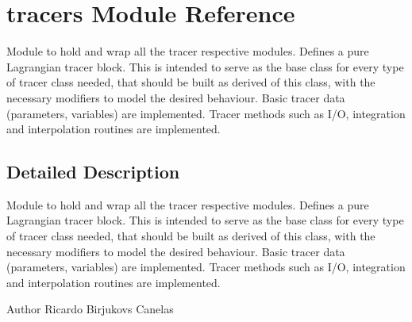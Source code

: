 \hypertarget{namespacetracers}{}\section{tracers Module Reference}
\label{namespacetracers}


Module to hold and wrap all the tracer respective modules. Defines a pure Lagrangian tracer block. This is intended to serve as the base class for every type of tracer class needed, that should be built as derived of this class, with the necessary modifiers to model the desired behaviour. Basic tracer data (parameters, variables) are implemented. Tracer methods such as I/O, integration and interpolation routines are implemented.  




\subsection{Detailed Description}
Module to hold and wrap all the tracer respective modules. Defines a pure Lagrangian tracer block. This is intended to serve as the base class for every type of tracer class needed, that should be built as derived of this class, with the necessary modifiers to model the desired behaviour. Basic tracer data (parameters, variables) are implemented. Tracer methods such as I/O, integration and interpolation routines are implemented. 

\begin{DoxyAuthor}{Author}
Ricardo Birjukovs Canelas 
\end{DoxyAuthor}
